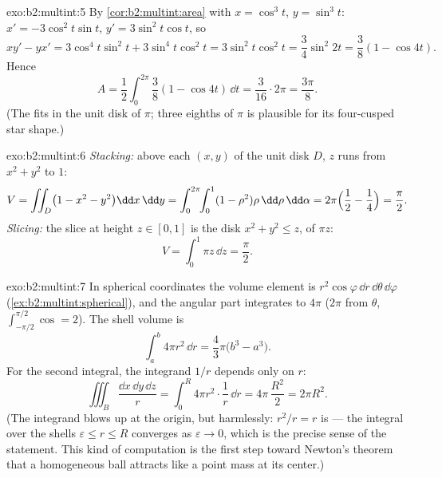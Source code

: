 \begin{solution}{exo:b2:multint:5}
By \cref{cor:b2:multint:area} with $x = \cos^3 t$, $y = \sin^3 t$:
$x' = -3\cos^2 t\sin t$, $y' = 3\sin^2 t\cos t$, so
\[
xy' - yx' = 3\cos^4 t\sin^2 t + 3\sin^4 t\cos^2 t
= 3\sin^2 t\cos^2 t = \frac{3}{4}\sin^2 2t
= \frac{3}{8}(1 - \cos 4t) .
\]
Hence
\[
A = \frac12\int_0^{2\pi}\frac38(1 - \cos 4t)\,\dd t
= \frac{3}{16}\cdot 2\pi = \frac{3\pi}{8} .
\]
(The  fits in the unit disk of  $\pi$; three eighths of
$\pi$ is plausible for its four-cusped star shape.)
\end{solution}

\begin{solution}{exo:b2:multint:6}
\emph{Stacking:} above each $(x, y)$ of the unit disk $D$, $z$
runs from $x^2 + y^2$ to $1$:
\[
V = \iint_D \bigl(1 - x^2 - y^2\bigr)\dd x\,\dd y
= \int_0^{2\pi}\!\!\int_0^1 (1 - \rho^2)\rho\,\dd\rho\,\dd\alpha
= 2\pi\Bigl(\frac12 - \frac14\Bigr) = \frac\pi2 .
\]
\emph{Slicing:} the slice at height $z \in [0, 1]$ is the disk
$x^2 + y^2 \leq z$, of  $\pi z$:
\[
V = \int_0^1 \pi z\,\dd z = \frac\pi2 .
\]
\end{solution}

\begin{solution}{exo:b2:multint:7}
In spherical coordinates the volume element is
$r^2\cos\varphi\,\dd r\,\dd\theta\,\dd\varphi$
(\cref{ex:b2:multint:spherical}), and the angular part integrates
to $4\pi$ ($2\pi$ from $\theta$, $\int_{-\pi/2}^{\pi/2}\cos = 2$).
The shell volume is
\[
\int_a^b 4\pi r^2\,\dd r = \frac43\pi\bigl(b^3 - a^3\bigr).
\]
For the second integral, the integrand $1/r$ depends only on $r$:
\[
\iiint_B \frac{\dd x\,\dd y\,\dd z}{r}
= \int_0^R 4\pi r^2\cdot\frac1r\,\dd r
= 4\pi\,\frac{R^2}{2} = 2\pi R^2 .
\]
(The integrand blows up at the origin, but harmlessly: $r^2/r = r$
is  --- the integral over the shells $\varepsilon \leq r
\leq R$ converges as $\varepsilon \to 0$, which is the precise
sense of the statement. This kind of computation is the first
step toward Newton's theorem that a homogeneous ball attracts like
a point mass at its center.)
\end{solution}

